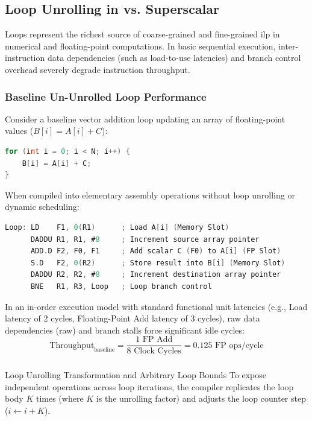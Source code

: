 \subsection{Loop Unrolling in  vs. Superscalar}
\label{sec:vliw_loop_unrolling}

Loops represent the richest source of coarse-grained and fine-grained \gls{ilp} in numerical and floating-point computations. In basic sequential execution, inter-instruction data dependencies (such as load-to-use latencies) and branch control overhead severely degrade instruction throughput.

\subsubsection{Baseline Un-Unrolled Loop Performance}
Consider a baseline vector addition loop updating an array of floating-point values ($B[i] = A[i] + C$):

\begin{lstlisting}[language=C, caption={Baseline Vector Addition Loop}]
for (int i = 0; i < N; i++) {
    B[i] = A[i] + C;
}
\end{lstlisting}

When compiled into elementary assembly operations without loop unrolling or dynamic scheduling:
\begin{lstlisting}[language=C, caption={Assembly Representation of Baseline Loop}]
Loop: LD    F1, 0(R1)      ; Load A[i] (Memory Slot)
      DADDU R1, R1, #8     ; Increment source array pointer
      ADD.D F2, F0, F1     ; Add scalar C (F0) to A[i] (FP Slot)
      S.D   F2, 0(R2)      ; Store result into B[i] (Memory Slot)
      DADDU R2, R2, #8     ; Increment destination array pointer
      BNE   R1, R3, Loop   ; Loop branch control
\end{lstlisting}

In an in-order execution model with standard functional unit latencies (e.g., Load latency of 2 cycles, Floating-Point Add latency of 3 cycles), raw data dependencies (\gls{raw}) and branch stalls force significant idle cycles:
\begin{equation}
\text{Throughput}_{\text{baseline}} = \frac{1 \text{ FP Add}}{8 \text{ Clock Cycles}} = 0.125 \text{ FP ops/cycle}
\end{equation}

\subsubsection{}{Loop Unrolling Transformation and Arbitrary Loop Bounds}
To expose independent operations across loop iterations, the compiler replicates the loop body $K$ times (where $K$ is the unrolling factor) and adjusts the loop counter step ($i \leftarrow i + K$).

